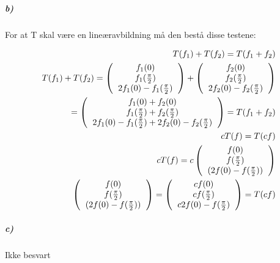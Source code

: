 \documentclass[11pt, A4paper,norsk]{article}
\begin{document}
			\subparagraph{b)}
				\begin{flushleft}
For at T skal være en lineæravbildning må den bestå disse testene:
				\end{flushleft}
				\begin{align}
T(f_1) + T(f_2) = T(f_1 + f_2) \\
T(f_1) + T(f_2) = \left(
\begin{tabular} { c }
$f_1(0)$ \\
$f_1(\frac{\pi}{2})$ \\
$2 f_1(0) - f_1(\frac{\pi}{2})$
\end{tabular}
\right)
+ 
\left(
\begin{tabular} { c }
$f_2(0)$ \\
$f_2(\frac{\pi}{2})$ \\
$2 f_2(0) - f_2(\frac{\pi}{2})$
\end{tabular}
\right) \nonumber \\
=
\left(
\begin{tabular} { c }
$f_1(0) + f_2(0)$ \\
$f_1(\frac{\pi}{2}) + f_2(\frac{\pi}{2})$ \\
$2 f_1(0) - f_1(\frac{\pi}{2}) + 2 f_2(0) - f_2(\frac{\pi}{2})$
\end{tabular}
\right)
= T(f_1 + f_2) \nonumber \\
cT(f) = T(cf) \\
cT(f) = c \left(
\begin{tabular} { c }
$f(0)$ \\
$f(\frac{\pi}{2})$ \\
$(2 f(0) - f(\frac{\pi}{2}))$
\end{tabular}
\right) \\
\left(
\begin{tabular} { c }
$f(0)$ \\
$f(\frac{\pi}{2})$ \\
$(2 f(0) - f(\frac{\pi}{2}))$
\end{tabular}
\right)
= 
\left(
\begin{tabular} { c }
$cf(0)$ \\
$cf(\frac{\pi}{2})$ \\
$c2 f(0) - f(\frac{\pi}{2})$
\end{tabular}
\right)
= T(cf)
				\end{align}







			\subparagraph{c)}
				\begin{flushleft}
Ikke besvart
				\end{flushleft}
\end{document}
